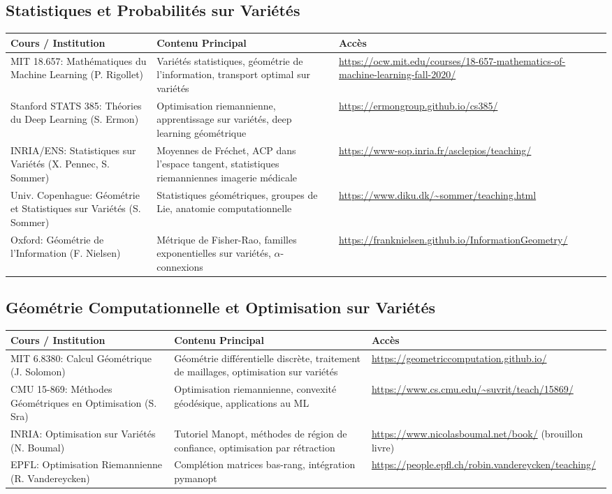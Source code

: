 \documentclass[11pt,a4paper]{article}
\begin{document}
\subsection{Statistiques et Probabilités sur Variétés}
\begin{longtable}{@{}p{3.2cm}p{5.5cm}p{5.3cm}@{}}
\toprule
\textbf{Cours / Institution} & \textbf{Contenu Principal} & \textbf{Accès} \\
\midrule
MIT 18.657: Mathématiques du Machine Learning (P. Rigollet) & Variétés statistiques, géométrie de l'information, transport optimal sur variétés & \url{https://ocw.mit.edu/courses/18-657-mathematics-of-machine-learning-fall-2020/} \\
Stanford STATS 385: Théories du Deep Learning (S. Ermon) & Optimisation riemannienne, apprentissage sur variétés, deep learning géométrique & \url{https://ermongroup.github.io/cs385/} \\
INRIA/ENS: Statistiques sur Variétés (X. Pennec, S. Sommer) & Moyennes de Fréchet, ACP dans l'espace tangent, statistiques riemanniennes imagerie médicale & \url{https://www-sop.inria.fr/asclepios/teaching/} \\
Univ. Copenhague: Géométrie et Statistiques sur Variétés (S. Sommer) & Statistiques géométriques, groupes de Lie, anatomie computationnelle & \url{https://www.diku.dk/~sommer/teaching.html} \\
Oxford: Géométrie de l'Information (F. Nielsen) & Métrique de Fisher-Rao, familles exponentielles sur variétés, $\alpha$-connexions & \url{https://franknielsen.github.io/InformationGeometry/} \\
\bottomrule
\end{longtable}

\subsection{Géométrie Computationnelle et Optimisation sur Variétés}
\begin{longtable}{@{}p{3.2cm}p{5.5cm}p{5.3cm}@{}}
\toprule
\textbf{Cours / Institution} & \textbf{Contenu Principal} & \textbf{Accès} \\
\midrule
MIT 6.8380: Calcul Géométrique (J. Solomon) & Géométrie différentielle discrète, traitement de maillages, optimisation sur variétés & \url{https://geometriccomputation.github.io/} \\
CMU 15-869: Méthodes Géométriques en Optimisation (S. Sra) & Optimisation riemannienne, convexité géodésique, applications au ML & \url{https://www.cs.cmu.edu/~suvrit/teach/15869/} \\
INRIA: Optimisation sur Variétés (N. Boumal) & Tutoriel Manopt, méthodes de région de confiance, optimisation par rétraction & \url{https://www.nicolasboumal.net/book/} (brouillon livre) \\
EPFL: Optimisation Riemannienne (R. Vandereycken) & Complétion matrices bas-rang, intégration pymanopt & \url{https://people.epfl.ch/robin.vandereycken/teaching/} \\
\bottomrule
\end{longtable}
\end{document}
